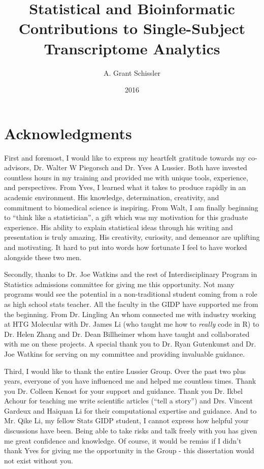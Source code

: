 \documentclass[final]{ua-thesis}
\author{A. Grant Schissler}
\title{Statistical and Bioinformatic Contributions to Single-Subject Transcriptome Analytics}
\date{2016}
\numberwithin{equation}{section}
\begin{document}
\maketitle

\chapter*{Acknowledgments}
First and foremost, I would like to express my heartfelt gratitude towards my co-advisors, Dr. Walter W Piegorsch and Dr. Yves A Lussier. Both have invested countless hours in my training and provided me with unique tools, experience, and perspectives. From Yves, I learned what it takes to produce rapidly in an academic environment. His knowledge, determination, creativity, and commitment to biomedical science is inspiring. From Walt, I am finally beginning to ``think like a statistician'', a gift which was my motivation for this graduate experience. His ability to explain statistical ideas through his writing and presentation is truly amazing. His creativity, curiosity, and demeanor are uplifting and motivating. It hard to put into words how fortunate I feel to have worked alongside these two men.

Secondly, thanks to Dr. Joe Watkins and the rest of Interdisciplinary Program in Statistics admissions committee for giving me this opportunity. Not many programs would see the potential in a non-traditional student coming from a role as high school stats teacher. All the faculty in the GIDP have supported me from the beginning. From Dr. Lingling An whom connected me with industry working at HTG Molecular with Dr. James Li (who taught me how to \emph{really} code in R) to Dr. Helen Zhang and Dr. Dean Billheimer whom have taught and collaborated with me on these projects. A special thank you to Dr. Ryan Gutenkunst and Dr. Joe Watkins for serving on my committee and providing invaluable guidance.

Third, I would like to thank the entire Lussier Group. Over the past two plus years, everyone of you have influenced me and helped me countless times. Thank you Dr. Colleen Kenost for your support and guidance. Thank you Dr. Ikbel Achour for teaching me write scientific articles (``tell a story'') and Drs. Vincent Gardeux and Haiquan Li for their computational expertise and guidance. And to Mr. Qike Li, my fellow Stats GIDP student, I cannot express how helpful your discussions have been. Being able to take risks and talk freely with you has given me great confidence and knowledge. Of course, it would be remiss if I didn't thank Yves for giving me the opportunity in the Group - this dissertation would not exist without you.
\end{document}
